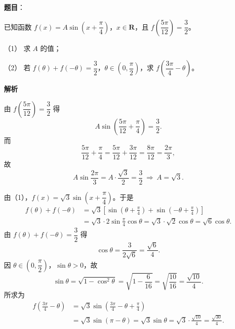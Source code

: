 \begin{answer}

\textbf{题目}：

已知函数 $f(x)=A\sin\left(x+\dfrac\pi4\right)$，$x\in\mathbf R$，且 $f\left(\dfrac{5\pi}{12}\right)=\dfrac32$。

（1） 求 $A$ 的值；

（2） 若 $f(\theta)+f(-\theta)=\dfrac32$，$\theta\in\left(0,\dfrac\pi2\right)$，求 $f\left(\dfrac{3\pi}4-\theta\right)$。

\textbf{解析}


由 $f\left(\dfrac{5\pi}{12}\right)=\dfrac32$ 得
\nopagebreak[4]
\[A\sin\left(\frac{5\pi}{12}+\frac\pi4\right)=\frac32.\]
而
\nopagebreak[4]
\[\frac{5\pi}{12}+\frac\pi4=\frac{5\pi}{12}+\frac{3\pi}{12}=\frac{8\pi}{12}=\frac{2\pi}{3},\]
故
\nopagebreak[4]
\[A\sin\frac{2\pi}{3}=A\cdot\frac{\sqrt3}{2}=\frac32\ \Longrightarrow\ A=\sqrt3.\]


由（1），$f(x)=\sqrt3\sin\left(x+\dfrac\pi4\right)$。于是
\nopagebreak[4]
\[\begin{aligned}
f(\theta)+f(-\theta)
&=\sqrt3\left[\sin\left(\theta+\frac\pi4\right)+\sin\left(-\theta+\frac\pi4\right)\right]\\
&=\sqrt3\cdot2\sin\frac\pi4\cos\theta
=\sqrt3\cdot\sqrt2\cos\theta=\sqrt6\cos\theta.
\end{aligned}\]
由 $f(\theta)+f(-\theta)=\dfrac32$ 得
\nopagebreak[4]
\[\cos\theta=\frac{3}{2\sqrt6}=\frac{\sqrt6}{4}.\]
因 $\theta\in\left(0,\dfrac\pi2\right)$，$\sin\theta>0$，故
\nopagebreak[4]
\[\sin\theta=\sqrt{1-\cos^2\theta}
=\sqrt{1-\frac{6}{16}}=\sqrt{\frac{10}{16}}=\frac{\sqrt{10}}{4}.\]
所求为
\nopagebreak[4]
\[\begin{aligned}
f\left(\frac{3\pi}{4}-\theta\right)
&=\sqrt3\sin\left(\frac{3\pi}{4}-\theta+\frac\pi4\right)\\
&=\sqrt3\sin(\pi-\theta)=\sqrt3\sin\theta
=\sqrt3\cdot\frac{\sqrt{10}}{4}=\frac{\sqrt{30}}{4}.
\end{aligned}\]



\end{answer}
